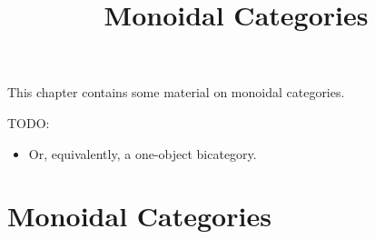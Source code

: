 

%



\title{Monoidal Categories}

\maketitle

\label{section-phantom}

This chapter contains some material on monoidal categories.

\ChapterTableOfContents

TODO:
\begin{itemize}
    \item Or, equivalently, a one-object bicategory.
\end{itemize}

\section{Monoidal Categories}\label{section-monoidal-categories}
